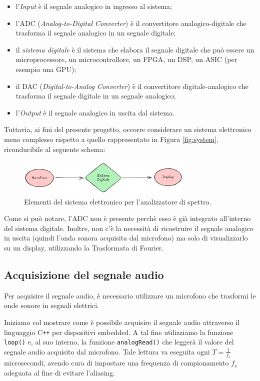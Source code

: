 \documentclass[a4paper,12pt]{report}  %
\newcommand{\lstinlinebg}[1]{\colorbox{backcolour}{\lstinline|#1|}}
\begin{document}
\begin{itemize}
    \item l'\textit{Input} è il segnale analogico in ingresso al sistema;
    \item l'ADC (\textit{Analog-to-Digital Converter}) è il convertitore analogico-digitale che trasforma il segnale analogico in un segnale digitale;
    \item il \textit{sistema digitale} è il sistema che elabora il segnale digitale che può essere un microprocessore, un microcontrollore, un FPGA, un DSP, un ASIC (per esempio una GPU);
    \item il DAC (\textit{Digital-to-Analog Converter}) è il convertitore digitale-analogico che trasforma il segnale digitale in un segnale analogico;
    \item l'\textit{Output} è il segnale analogico in uscita dal sistema.
\end{itemize}

Tuttavia, ai fini del presente progetto, occorre considerare un sistema elettronico meno complesso rispetto a quello rappresentato in Figura \ref{fig:system}, riconducibile al seguente schema:

\begin{figure}[h]
    \centering
    \includegraphics[width=0.75\textwidth]{imgs/electronics-system-elements-fft.png}
    \caption{Elementi del sistema elettronico per l'analizzatore di spettro.}
    \label{fig:easy_system}
\end{figure}

Come si può notare, l'ADC non è presente perchè esso è già integrato all'interno del sistema digitale.
Inoltre, non c'è la necessità di ricostruire il segnale analogico in uscita (quindi l'onda sonora acquisita dal microfono) ma solo di visualizzarlo su un display, utilizzando la Trasformata di Fourier.

\subsection{Acquisizione del segnale audio}\label{sec:acquisition}
Per acquisire il segnale audio, è necessario utilizzare un microfono che trasformi le onde sonore in segnali elettrici.

Iniziamo col mostrare come è possibile acquisire il segnale audio attraverso il linguaggio C\texttt{++} per dispositivi embedded.
A tal fine utilizziamo la funzione \lstinlinebg{loop()} e, al suo interno, la funzione \lstinlinebg{analogRead()} che leggerà il valore del segnale audio acquisito dal microfono.
Tale lettura va eseguita ogni $T = \frac{1}{f_s}$ microsecondi, avendo cura di impostare una frequenza di campionamento $f_s$ adeguata al fine di evitare l'aliasing.
\end{document}
